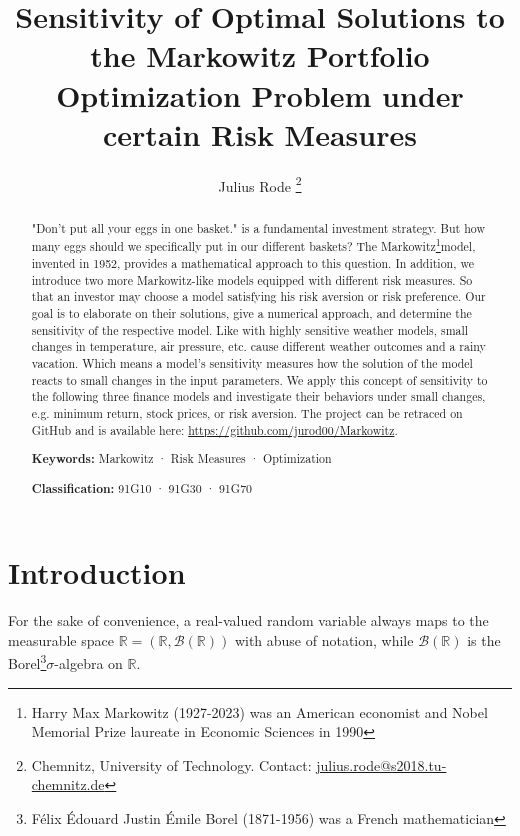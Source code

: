\documentclass[a4paper, english, 11pt, onecolumn, oneside, final]{article}
\title{
    Sensitivity of Optimal Solutions to the Markowitz Portfolio Optimization Problem under certain Risk Measures
}
\author{
    Julius Rode%
        \thanks{Chemnitz, University of Technology. Contact: \href{mailto:julius.rode@s2018.tu-chemnitz.de}{julius.rode@s2018.tu-chemnitz.de}}
}
\numberwithin{equation}{section}   %
\newcommand{\R}{\mathbb{R}}                 %
\theoremstyle{plain}
\theoremstyle{definition}
\theoremstyle{remark}
\begin{document}
\maketitle

\begin{abstract}
"Don't put all your eggs in one basket." is a fundamental investment strategy. But how many eggs should we specifically put in our different baskets? The Markowitz\footnote{Harry Max Markowitz (1927-2023) was an American economist and Nobel Memorial Prize laureate in Economic Sciences in 1990}model, invented in 1952, provides a mathematical approach to this question. In addition, we introduce two more Markowitz-like models equipped with different risk measures. So that an investor may choose a model satisfying his risk aversion or risk preference. Our goal is to elaborate on their solutions, give a numerical approach, and determine the sensitivity of the respective model. Like with highly sensitive weather models, small changes in temperature, air pressure, etc. cause different weather outcomes and a rainy vacation. Which means a model's sensitivity measures how the solution of the model reacts to small changes in the input parameters. We apply this concept of sensitivity to the following three finance models and investigate their behaviors under small changes, e.g. minimum return, stock prices, or risk aversion. The project can be retraced on GitHub and is available here: \href{https://github.com/jurod00/Markowitz}{https://github.com/jurod00/Markowitz}.\medskip

\noindent\textbf{Keywords:} Markowitz · Risk Measures · Optimization\par
\noindent\textbf{Classification:} 91G10 · 91G30 · 91G70
\end{abstract}
\section{Introduction}
For the sake of convenience, a real-valued random variable always maps to the measurable space $\R=(\R,\mathcal{B}(\R))$ with abuse of notation, while $\mathcal{B}(\R)$ is the Borel\footnote{F\'elix \'Edouard Justin \'Emile Borel (1871-1956) was a French mathematician}$\sigma$-algebra on $\R$. \medskip
\end{document}
